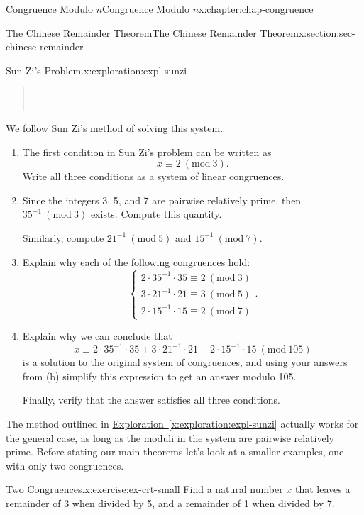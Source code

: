 \documentclass[oneside,10pt,]{book}
\newcommand{\xreffont}{\relax}
\numberwithin{equation}{section}
\newcommand{\Mod}[1]{\ \left(\mathrm{mod}\ #1\right)}
\begin{document}
\begin{chapterptx}{Congruence Modulo \(n\)}{}{Congruence Modulo \(n\)}{}{}{x:chapter:chap-congruence}
\begin{sectionptx}{The Chinese Remainder Theorem}{}{The Chinese Remainder Theorem}{}{}{x:section:sec-chinese-remainder}
\begin{exploration}{Sun Zi's Problem.}{x:exploration:expl-sunzi}
\begin{quote}
{\begin{tabular}[t]{l@{}}
\end{tabular}}\\\par
\end{quote}
We follow Sun Zi's method of solving this system.%
\begin{enumerate}[font=\bfseries,label=(\alph*),ref=\alph*]
\item{}The first condition in Sun Zi's problem can be written as%
\begin{equation*}
x \equiv 2 \Mod{3}\text{.}
\end{equation*}
Write all three conditions as a system of linear congruences.%
\item{}Since the integers 3, 5, and 7 are pairwise relatively prime, then \(35^{-1} \Mod{3}\) exists. Compute this quantity.%
\par
Similarly, compute \(21^{-1} \Mod{5}\) and \(15^{-1} \Mod{7}\).%
\item{}Explain why each of the following congruences hold:%
\begin{equation*}
\begin{cases} 2 \cdot 35^{-1} \cdot 35 \equiv 2 \Mod{3} \\ 3 \cdot 21^{-1} \cdot 21 \equiv 3 \Mod{5} \\ 2 \cdot 15^{-1} \cdot 15 \equiv 2 \Mod{7} \end{cases}\text{.}
\end{equation*}
%
\item{}Explain why we can conclude that%
\begin{equation*}
x \equiv 2 \cdot 35^{-1} \cdot 35 + 3 \cdot 21^{-1} \cdot 21 + 2 \cdot 15^{-1} \cdot 15 \Mod{105}
\end{equation*}
is a solution to the original system of congruences, and using your answers from (b) simplify this expression to get an answer modulo 105.%
\par
Finally, verify that the answer satisfies all three conditions.%
\end{enumerate}
\end{exploration}
The method outlined in \hyperref[x:exploration:expl-sunzi]{Exploration~{\xreffont\ref{x:exploration:expl-sunzi}}} actually works for the general case, as long as the moduli in the system are pairwise relatively prime. Before stating our main theorems let's look at a smaller examples, one with only two congruences.%
\begin{inlineexercise}{Two Congruences.}{x:exercise:ex-crt-small}%
Find a natural number \(x\) that leaves a remainder of 3 when divided by 5, and a remainder of 1 when divided by 7.%

\end{inlineexercise}
\end{sectionptx}
\end{chapterptx}
\end{document}
